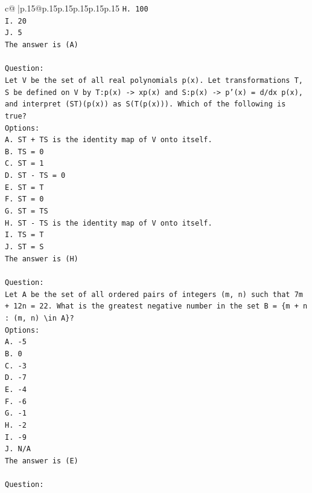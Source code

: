 \documentclass{article}
\begin{document}
{\begin{supertabular}{c@{$\;$}|p{.15\linewidth}@{}p{.15\linewidth}p{.15\linewidth}p{.15\linewidth}p{.15\linewidth}p{.15\linewidth}}
{{{\texttt{H. 100} \\
\texttt{I. 20} \\
\texttt{J. 5} \\
\texttt{The answer is (A)} \\
\\ 
\texttt{Question:} \\
\texttt{Let V be the set of all real polynomials p(x). Let transformations T, S be defined on V by T:p(x) {-}> xp(x) and S:p(x) {-}> p'(x) = d/dx p(x), and interpret (ST)(p(x)) as S(T(p(x))). Which of the following is true?} \\
\texttt{Options:} \\
\texttt{A. ST + TS is the identity map of V onto itself.} \\
\texttt{B. TS = 0} \\
\texttt{C. ST = 1} \\
\texttt{D. ST {-} TS = 0} \\
\texttt{E. ST = T} \\
\texttt{F. ST = 0} \\
\texttt{G. ST = TS} \\
\texttt{H. ST {-} TS is the identity map of V onto itself.} \\
\texttt{I. TS = T} \\
\texttt{J. ST = S} \\
\texttt{The answer is (H)} \\
\\ 
\texttt{Question:} \\
\texttt{Let A be the set of all ordered pairs of integers (m, n) such that 7m + 12n = 22. What is the greatest negative number in the set B = \{m + n : (m, n) \textbackslash{}in A\}?} \\
\texttt{Options:} \\
\texttt{A. {-}5} \\
\texttt{B. 0} \\
\texttt{C. {-}3} \\
\texttt{D. {-}7} \\
\texttt{E. {-}4} \\
\texttt{F. {-}6} \\
\texttt{G. {-}1} \\
\texttt{H. {-}2} \\
\texttt{I. {-}9} \\
\texttt{J. N/A} \\
\texttt{The answer is (E)} \\
\\ 
\texttt{Question:} \\
}}}
\end{supertabular}}
\end{document}
